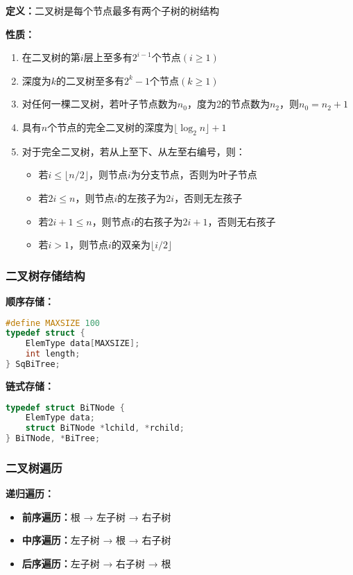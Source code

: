 \documentclass[12pt,a4paper]{amsart}
\begin{document}
\textbf{定义：}二叉树是每个节点最多有两个子树的树结构

\textbf{性质：}
\begin{enumerate}
\item 在二叉树的第$i$层上至多有$2^{i-1}$个节点$(i \geq 1)$
\item 深度为$k$的二叉树至多有$2^k-1$个节点$(k \geq 1)$
\item 对任何一棵二叉树，若叶子节点数为$n_0$，度为2的节点数为$n_2$，则$n_0 = n_2 + 1$
\item 具有$n$个节点的完全二叉树的深度为$\lfloor \log_2 n \rfloor + 1$
\item 对于完全二叉树，若从上至下、从左至右编号，则：
   \begin{itemize}
   \item 若$i \leq \lfloor n/2 \rfloor$，则节点$i$为分支节点，否则为叶子节点
   \item 若$2i \leq n$，则节点$i$的左孩子为$2i$，否则无左孩子
   \item 若$2i+1 \leq n$，则节点$i$的右孩子为$2i+1$，否则无右孩子
   \item 若$i > 1$，则节点$i$的双亲为$\lfloor i/2 \rfloor$
   \end{itemize}
\end{enumerate}

\subsubsection{二叉树存储结构}

\textbf{顺序存储：}
\begin{lstlisting}[language=C++]
#define MAXSIZE 100
typedef struct {
    ElemType data[MAXSIZE];
    int length;
} SqBiTree;
\end{lstlisting}

\textbf{链式存储：}
\begin{lstlisting}[language=C++]
typedef struct BiTNode {
    ElemType data;
    struct BiTNode *lchild, *rchild;
} BiTNode, *BiTree;
\end{lstlisting}

\subsubsection{二叉树遍历}

\textbf{递归遍历：}
\begin{itemize}
\item \textbf{前序遍历：}根 → 左子树 → 右子树
\item \textbf{中序遍历：}左子树 → 根 → 右子树  
\item \textbf{后序遍历：}左子树 → 右子树 → 根
\end{itemize}
\end{document}
